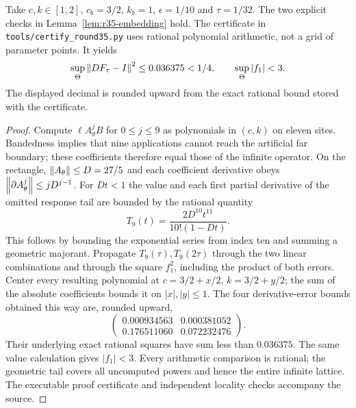 \begin{proposition}
\label{prop:r35-certificate}
Take $c,k\in[1,2]$, $c_b=3/2$, $k_b=1$, $\epsilon=1/10$ and $\tau=1/32$.
The two explicit checks in Lemma~\ref{lem:r35-embedding} hold. The certificate in
\texttt{tools/certify\_round35.py} uses rational polynomial arithmetic, not a grid of parameter points. It yields
\[
 \sup_\Theta\left\|DF_\tau-I\right\|^2\le 0.036375<1/4,
 \qquad \sup_\Theta|f_1|<3.
\]
The displayed decimal is rounded upward from the exact rational bound stored with the certificate.
\end{proposition}
\begin{proof}
Compute $\ell A_\theta^jB$ for $0\le j\le9$ as polynomials in $(c,k)$ on eleven sites. Bandedness implies that nine applications cannot reach the artificial far boundary; these coefficients therefore equal those of the infinite operator. On the rectangle, $\left\|A_\theta\right\|\le D=27/5$ and each coefficient derivative obeys $\left\|\partial A_\theta^j\right\|\le jD^{j-1}$. For $Dt<1$ the value and each first partial derivative of the omitted response tail are bounded by the rational quantity
\[
 T_9(t)=\frac{2D^{10}t^{11}}{10!(1-Dt)}.
\]
This follows by bounding the exponential series from index ten and summing a geometric majorant. Propagate $T_9(\tau),T_9(2\tau)$ through the two linear combinations and through the square $f_1^2$, including the product of both errors. Center every resulting polynomial at $c=3/2+x/2$, $k=3/2+y/2$; the sum of the absolute coefficients bounds it on $|x|,|y|\le1$. The four derivative-error bounds obtained this way are, rounded upward,
\[
 \begin{pmatrix}0.000934563&0.000381052\\0.176511060&0.072232476\end{pmatrix}.
\]
Their underlying exact rational squares have sum less than $0.036375$. The same value calculation gives $|f_1|<3$. Every arithmetic comparison is rational; the geometric tail covers all uncomputed powers and hence the entire infinite lattice. The executable proof certificate and independent locality checks accompany the source.
\end{proof}

